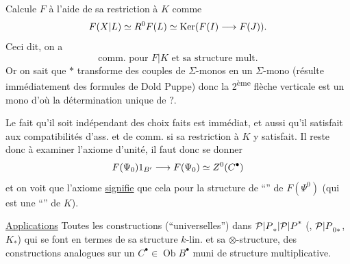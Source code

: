 Calcule $F$ à l'aide de sa restriction à $K$ comme
\[
F({X|L})\simeq R^0F(L)\simeq\operatorname{Ker}(F(I)\longrightarrow F(J)).
\]
Ceci dit, on a
\[
\text{comm. pour }F|K\text{ et sa structure mult.}
\]
Or on sait que \deleted{\unsure{$*$}} $*$ transforme des couples de $\Sigma$-monos en un $\Sigma$-mono (résulte immédiatement des formules de Dold Puppe) donc la 2\textsuperscript{ème} flèche verticale est un mono d'où la détermination unique de $?$.

Le fait qu'il soit indépendant des choix faits est immédiat, et aussi qu'il satisfait aux compatibilités d'ass. et de comm. si sa restriction à $K$ y satisfait. Il reste donc à examiner l'axiome d'unité,  il faut donc se donner
\[
F(\Psi_0)1_{B'}\longrightarrow F(\Psi_0)\simeq Z^0(C^\bullet)
\]
et on voit que l'axiome \uline{signifie} que cela  pour la structure de ``'' de $F(\Psi^0)$ (qui est une ``'' de $K$).


\uline{Applications} Toutes les constructions (``universelles'') dans ${{\mathcal P|P}_*|{\mathcal P|P}^*}$  (, ${\mathcal P|P}_{0*}$, $K_*$) qui se font  en termes de sa structure $k$-lin. et sa $\otimes$-structure,   des constructions analogues sur un $C^\bullet\in\operatorname{Ob}B^\bullet$ muni de structure multiplicative.

